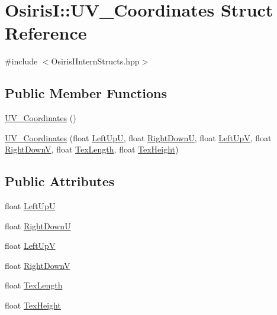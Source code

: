 \hypertarget{struct_osiris_i_1_1_u_v___coordinates}{\section{Osiris\-I\-:\-:U\-V\-\_\-\-Coordinates Struct Reference}
\label{struct_osiris_i_1_1_u_v___coordinates}
}


{\ttfamily \#include $<$Osiris\-I\-Intern\-Structs.\-hpp$>$}

\subsection*{Public Member Functions}
\begin{DoxyCompactItemize}
\item 
\hyperlink{struct_osiris_i_1_1_u_v___coordinates_a755e839812f833081e43096f5b16bc32}{U\-V\-\_\-\-Coordinates} ()
\item 
\hyperlink{struct_osiris_i_1_1_u_v___coordinates_a3908a347b1b0d5da13c5a9739d7341d7}{U\-V\-\_\-\-Coordinates} (float \hyperlink{struct_osiris_i_1_1_u_v___coordinates_ae1f4f1fc515e099c85417da578f3777c}{Left\-Up\-U}, float \hyperlink{struct_osiris_i_1_1_u_v___coordinates_a397f8777c590bc2599da5988bb313029}{Right\-Down\-U}, float \hyperlink{struct_osiris_i_1_1_u_v___coordinates_ab47bb3793b49a5b604045706f87e0846}{Left\-Up\-V}, float \hyperlink{struct_osiris_i_1_1_u_v___coordinates_af0126b48abd784477c95804237dd37c3}{Right\-Down\-V}, float \hyperlink{struct_osiris_i_1_1_u_v___coordinates_aef136203ffad84348049e97205c88aea}{Tex\-Length}, float \hyperlink{struct_osiris_i_1_1_u_v___coordinates_a9a341baaa255aa4ea11adab7a59f16f9}{Tex\-Height})
\end{DoxyCompactItemize}
\subsection*{Public Attributes}
\begin{DoxyCompactItemize}
\item 
float \hyperlink{struct_osiris_i_1_1_u_v___coordinates_ae1f4f1fc515e099c85417da578f3777c}{Left\-Up\-U}
\item 
float \hyperlink{struct_osiris_i_1_1_u_v___coordinates_a397f8777c590bc2599da5988bb313029}{Right\-Down\-U}
\item 
float \hyperlink{struct_osiris_i_1_1_u_v___coordinates_ab47bb3793b49a5b604045706f87e0846}{Left\-Up\-V}
\item 
float \hyperlink{struct_osiris_i_1_1_u_v___coordinates_af0126b48abd784477c95804237dd37c3}{Right\-Down\-V}
\item 
float \hyperlink{struct_osiris_i_1_1_u_v___coordinates_aef136203ffad84348049e97205c88aea}{Tex\-Length}
\item 
float \hyperlink{struct_osiris_i_1_1_u_v___coordinates_a9a341baaa255aa4ea11adab7a59f16f9}{Tex\-Height}
\end{DoxyCompactItemize}


